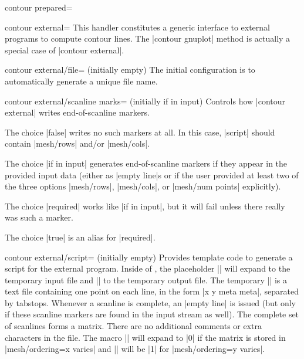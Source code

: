 {{\begin{plottype}[/pgfplots]{contour prepared=\textcolor{black}{}}
\end{plottype}


\begin{plottype}[/pgfplots]{contour external=\textcolor{black}{}}
	This handler constitutes a generic interface to external programs to compute contour lines. The |contour gnuplot| method is actually a special case of |contour external|.

	\begin{pgfplotskey}{contour external/file= (initially empty)}
		The initial configuration is to automatically generate a unique file name.
	\end{pgfplotskey}

	\begin{pgfplotskey}{contour external/scanline marks= (initially if in input)}
		Controls how |contour external| writes end-of-scanline markers. 

		The choice |false| writes no such markers at all. In this case, |script| should contain |mesh/rows| and/or |mesh/cols|.

		The choice |if in input| generates end-of-scanline markers if they appear in the provided input data (either as |empty line|s or if the user provided at least two of the three options |mesh/rows|, |mesh/cols|, or |mesh/num points| explicitly).

		The choice |required| works like |if in input|, but it will fail unless there really was such a marker.

		The choice |true| is an alias for |required|.
	\end{pgfplotskey}

	\begin{pgfplotskey}{contour external/script= (initially empty)}
		Provides template code to generate a script for the external program. Inside of , the placeholder |\infile| will expand to the temporary input file and |\outfile| to the temporary output file. The temporary |\infile| is a text file containing one point on each line, in the form |x y meta meta|, separated by tabstops. Whenever a scanline is complete, an |empty line| is issued (but only if these scanline markers are found in the input stream as well). The complete set of scanlines forms a matrix. There are no additional comments or extra characters in the file. The macro |\ordering| will expand to |0| if the matrix is stored in |mesh/ordering=x varies| and |\ordering| will be |1| for |mesh/ordering=y varies|.


\end{pgfplotskey}
\end{plottype}}}
